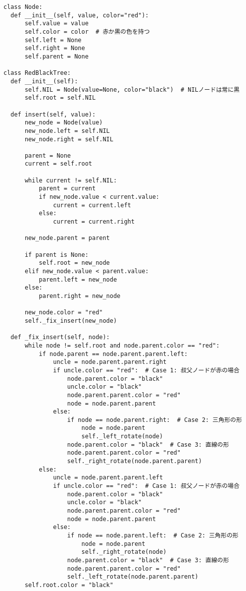 \begin{lstlisting}[caption=赤黒木の実装, label=redblacktree, frame=TRBL, label={redblacktree}]
class Node:
  def __init__(self, value, color="red"):
      self.value = value
      self.color = color  # 赤か黒の色を持つ
      self.left = None
      self.right = None
      self.parent = None

class RedBlackTree:
  def __init__(self):
      self.NIL = Node(value=None, color="black")  # NILノードは常に黒
      self.root = self.NIL

  def insert(self, value):
      new_node = Node(value)
      new_node.left = self.NIL
      new_node.right = self.NIL

      parent = None
      current = self.root

      while current != self.NIL:
          parent = current
          if new_node.value < current.value:
              current = current.left
          else:
              current = current.right

      new_node.parent = parent

      if parent is None:
          self.root = new_node
      elif new_node.value < parent.value:
          parent.left = new_node
      else:
          parent.right = new_node

      new_node.color = "red"
      self._fix_insert(new_node)

  def _fix_insert(self, node):
      while node != self.root and node.parent.color == "red":
          if node.parent == node.parent.parent.left:
              uncle = node.parent.parent.right
              if uncle.color == "red":  # Case 1: 叔父ノードが赤の場合
                  node.parent.color = "black"
                  uncle.color = "black"
                  node.parent.parent.color = "red"
                  node = node.parent.parent
              else:
                  if node == node.parent.right:  # Case 2: 三角形の形
                      node = node.parent
                      self._left_rotate(node)
                  node.parent.color = "black"  # Case 3: 直線の形
                  node.parent.parent.color = "red"
                  self._right_rotate(node.parent.parent)
          else:
              uncle = node.parent.parent.left
              if uncle.color == "red":  # Case 1: 叔父ノードが赤の場合
                  node.parent.color = "black"
                  uncle.color = "black"
                  node.parent.parent.color = "red"
                  node = node.parent.parent
              else:
                  if node == node.parent.left:  # Case 2: 三角形の形
                      node = node.parent
                      self._right_rotate(node)
                  node.parent.color = "black"  # Case 3: 直線の形
                  node.parent.parent.color = "red"
                  self._left_rotate(node.parent.parent)
      self.root.color = "black"


\end{lstlisting}
